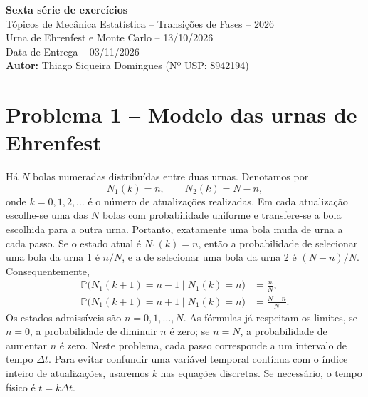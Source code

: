 \documentclass[12pt,a4paper]{article}
\newcommand{\Prob}{\mathbb{P}}
\begin{document}
\begin{center}
    {\Large \textbf{Sexta série de exercícios}}\\[0.6cm]
    {\large Tópicos de Mecânica Estatística -- Transições de Fases -- 2026}\\[0.2cm]
    {\large Urna de Ehrenfest e Monte Carlo -- 13/10/2026}\\[0.2cm]
    {\large Data de Entrega -- 03/11/2026}\\[0.2cm]
    {\Large \textbf{Autor:} Thiago Siqueira Domingues (Nº USP: 8942194)}
\end{center}
%
\vspace{0.4cm}
\section*{Problema 1 -- Modelo das urnas de Ehrenfest}
%
Há $N$ bolas numeradas distribuídas entre duas urnas. Denotamos por
\[
N_1(k)=n,\qquad N_2(k)=N-n,
\]
onde $k=0,1,2,\ldots$ é o número de atualizações realizadas. Em cada atualização escolhe-se uma das $N$ bolas com probabilidade uniforme e transfere-se a bola escolhida para a outra urna. Portanto, exatamente uma bola muda de urna a cada passo. Se o estado atual é $N_1(k)=n$, então a probabilidade de selecionar uma bola da urna 1 é $n/N$, e a de selecionar uma bola da urna 2 é $(N-n)/N$. Consequentemente,
%
\begin{align}
\Prob\bigl(N_1(k+1)=n-1\mid N_1(k)=n\bigr)&=\frac{n}{N}, \label{eq:down}\tag{1}\\
\Prob\bigl(N_1(k+1)=n+1\mid N_1(k)=n\bigr)&=\frac{N-n}{N}. \label{eq:up}\tag{2}
\end{align}
%
Os estados admissíveis são $n=0,1,\ldots,N$. As fórmulas já respeitam os limites, se $n=0$, a probabilidade de diminuir $n$ é zero; se $n=N$, a probabilidade de aumentar $n$ é zero. Neste problema, cada passo corresponde a um intervalo de tempo $\Delta t$. Para evitar confundir uma variável temporal contínua com o índice inteiro de atualizações, usaremos $k$ nas equações discretas. Se necessário, o tempo físico é $t=k\Delta t$.
%
\end{document}
